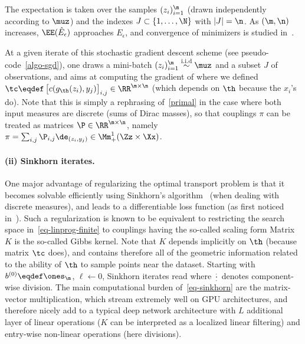 The expectation is taken over the samples $(z_i)_{i=1}^\m$ (drawn independently according to $\muz$) and the indexes $J \subset \{1,\ldots,\N\}$ with $|J|=\n$. As $(\m,\n)$ increases, $\EE(\hat E_\epsilon)$ approaches $E_\epsilon$, and convergence of minimizers is studied in~\cite{bernton2017inference}.

At a given iterate of this stochastic gradient descent scheme (see pseudo-code~\ref{algo-sgd}), one draws a mini-batch $(z_i)_{i=1}^{\m} \overset{\text{i.i.d}}{\sim} \muz$ and a subset $J$ of observations, and aims at computing the gradient of 
where we defined $\tc \eqdef \begin{bmatrix}c(g_\th(z_i), y_j)\end{bmatrix}_{i,j}\in\RR^{\m\times
\n}$ (which depends on $\th$ because the $x_i$'s do).
%
Note that this is simply a rephrasing of~\eqref{primal} in the case where both input measures are discrete (sums of Dirac masses), so that couplings $\pi$ can be treated as matrices $\P \in \RR^{\m \times \n}$, namely $\pi=\sum_{i,j} \P_{i,j} \de_{(z_i,y_j)} \in \Mm_+^1(\Zz \times \Xx)$. 
 
\paragraph{(ii) Sinkhorn iterates.}

One major advantage of regularizing the optimal transport problem is that it becomes solvable efficiently using Sinkhorn's algorithm~\cite{Sinkhorn64} (when dealing with discrete measures), and leads to a differentiable loss function (as first noticed in~\cite{CuturiSinkhorn,CuturiDoucet}). Such a regularization is known to be equivalent to restricting the search space in~\eqref{eq-linprog-finite} to couplings having the so-called scaling form
Matrix $K$ is the so-called Gibbs kernel. Note that $K$ depends implicitly on $\th$ (because matrix $\tc$ does), and contains therefore all of the geometric information related to the ability of $\th$ to sample points near the dataset.
%
Starting with $b^{(0)} \eqdef \ones_{\m}$, $\ell \leftarrow 0$, Sinkhorn iterates read
where $\frac{\cdot}{\cdot}$ denotes component-wise division. 
%
The main computational burden of~\eqref{eq-sinkhorn} are the matrix-vector multiplication, which stream extremely well on GPU architectures, and therefore nicely add to a typical deep network architecture with $L$ additional layer of linear operations ($K$ can be interpreted as a localized linear filtering) and entry-wise non-linear operations (here divisions). 

